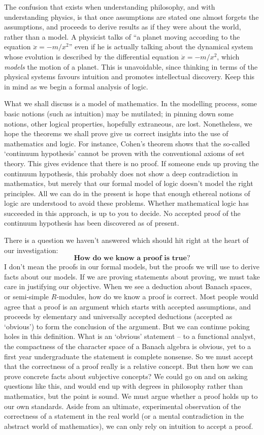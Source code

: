 The confusion that exists when understanding philosophy, and with understanding physics, is that once assumptions are stated one almost forgets the assumptions, and proceeds to derive results as if they were about the world, rather than a model. A physicist talks of ``a planet moving according to the equation $\ddot{x} = -m/x^2$'' even if he is actually talking about the dynamical system whose evolution is described by the differential equation $\ddot{x} = -m/x^2$, which {\it models} the motion of a planet. This is unavoidable, since thinking in terms of the physical systems favours intuition and promotes intellectual discovery. Keep this in mind as we begin a formal analysis of logic.

What we shall discuss is a model of mathematics. In the modelling process, some basic notions (such as intuition) may be mutilated; in pinning down some notions, other logical properties, hopefully extraneous, are lost. Nonetheless, we hope the theorems we shall prove give us correct insights into the use of mathematics and logic. For instance, Cohen's theorem shows that the so-called `continuum hypothesis' cannot be proven with the conventional axioms of set theory. This gives evidence that there is no proof. If someone ends up proving the continuum hypothesis, this probably does not show a deep contradiction in mathematics, but merely that our formal model of logic doesn't model the right principles. All we can do in the present is hope that enough ethereal notions of logic are understood to avoid these problems. Whether mathematical logic has succeeded in this approach, is up to you to decide. No accepted proof of the continuum hypothesis has been discovered as of present.

There is a question we haven't answered which should hit right at the heart of our investigation:
%
\[ \textbf{How do we know a proof is true?} \]
%
I don't mean the proofs in our formal models, but the proofs we will use to derive facts about our models. If we are proving statements about proving, we must take care in justifying our objective. When we see a deduction about Banach spaces, or semi-simple $R$-modules, how do we know a proof is correct. Most people would agree that a proof is an argument which starts with accepted assumptions, and proceeds by elementary and universally accepted deductions (accepted as `obvious') to form the conclusion of the argument. But we can continue poking holes in this definition. What is an `obvious' statement -- to a functional analyst, the compactness of the character space of a Banach algebra is obvious, yet to a first year undergraduate the statement is complete nonsense. So we must accept that the correctness of a proof really is a relative concept. But then how we can prove concrete facts about subjective concepts? We could go on and on asking questions like this, and would end up with degrees in philosophy rather than mathematics, but the point is sound. We must argue whether a proof holds up to our own standards. Aside from an ultimate, experimental observation of the correctness of a statement in the real world (or a mental contradiction in the abstract world of mathematics), we can only rely on intuition to accept a proof.


